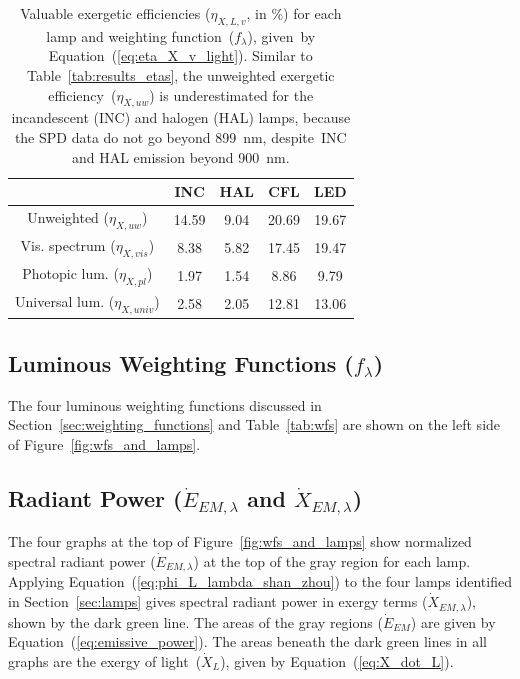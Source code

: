\documentclass[energies,article,accept,moreauthors,pdftex]{Definitions/mdpi}\usepackage[]{graphicx}\usepackage[]{color}
\begin{document}
\begin{table}[H]
\centering
\caption{Valuable exergetic efficiencies
                     ($\eta_{X,L,v}$, in \%) for each lamp
                     and weighting function~($f_\lambda$),
                     \mbox{given by} Equation~(\ref{eq:eta_X_v_light}).
                     Similar to Table~\ref{tab:results_etas}, 
                     the unweighted exergetic efficiency~($\eta_{X,uw}$) is 
                     underestimated for the incandescent (INC) and halogen (HAL) lamps, because
                     the SPD data do not go beyond 899~nm, 
                     \mbox{despite INC} and HAL emission beyond 900~nm.} 
\label{tab:results_etasX}
\begingroup\footnotesize
\begin{tabular}{ccccc}
  \toprule
 & \textbf{INC} & \textbf{HAL} & \textbf{CFL} & \textbf{LED} \\ 
  \midrule
Unweighted ($\eta_{X,uw}$) & 14.59 & 9.04 & 20.69 & 19.67 \\ 
  Vis. spectrum ($\eta_{X,vis}$) & 8.38 & 5.82 & 17.45 & 19.47 \\ 
  Photopic lum. ($\eta_{X,pl}$) & 1.97 & 1.54 & 8.86 & 9.79 \\ 
  Universal lum. ($\eta_{X,univ}$) & 2.58 & 2.05 & 12.81 & 13.06 \\ 
   \bottomrule
\end{tabular}
\endgroup
\end{table}
\subsection{Luminous Weighting Functions ($f_\lambda$)}
\label{sec:results_weighting_functions}

The four luminous weighting functions 
discussed in Section~\ref{sec:weighting_functions} and Table~\ref{tab:wfs}
are shown on the left side of Figure~\ref{fig:wfs_and_lamps}.


\subsection{Radiant Power ($\dot{E}_{EM,\lambda}$ and $\dot{X}_{EM,\lambda}$)}
\label{sec:results_radiant_power}

The four graphs at the top of Figure~\ref{fig:wfs_and_lamps}
show normalized spectral radiant power ($\dot{E}_{EM,\lambda}$) 
at the top of the gray region for each lamp.
Applying Equation~(\ref{eq:phi_L_lambda_shan_zhou}) 
to the four lamps identified in Section~\ref{sec:lamps}
gives spectral radiant power in exergy terms ($\dot{X}_{EM,\lambda}$),
shown by the dark green line.
The areas of the gray regions ($\dot{E}_{EM}$) are given by Equation~(\ref{eq:emissive_power}).
The areas beneath the dark green lines in all graphs are the exergy of light~($\dot{X}_L$), 
given by Equation~(\ref{eq:X_dot_L}).
\end{document}
